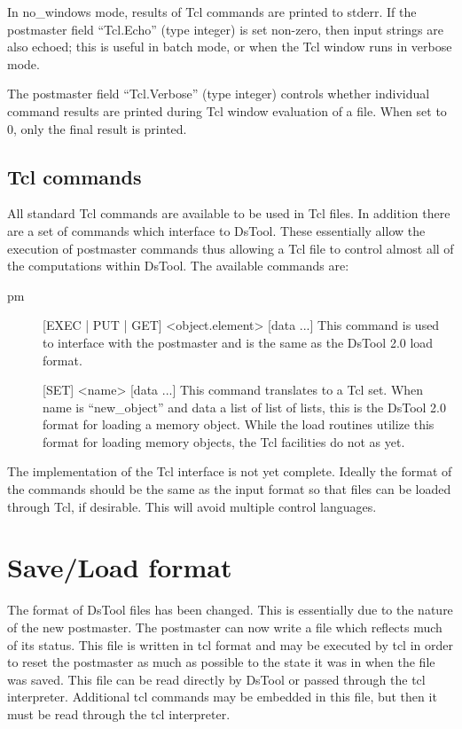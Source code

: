 In no\_windows mode, results of Tcl commands are printed to stderr. If
the postmaster field ``Tcl.Echo'' (type integer) is set non-zero, then 
input strings are also echoed; this is useful in batch mode, or when the 
Tcl window runs in verbose mode. 

The postmaster field ``Tcl.Verbose'' (type integer) controls whether 
individual command results are printed during Tcl window evaluation of
a file. When set to 0, only the final result is printed.

\subsection{Tcl commands}
All standard Tcl commands are available to be used in Tcl files.  In
addition there are a set of commands which interface to DsTool.  These
essentially allow the execution of postmaster commands thus allowing
a Tcl file to control almost all of the computations within DsTool.
The available commands are:
\begin{description}
\item[pm] [EXEC | PUT | GET] <object.element> [data ...]  This command is 
used to interface with the postmaster and is the same as the DsTool 2.0
load format.
\item[] [SET] <name> [data ...] This command translates to a Tcl set.
When name is ``new\_object'' and data a list of list of lists, this is the
DsTool 2.0 format for loading a memory object. While the load routines
utilize this format for loading memory objects, the Tcl facilities
do not as yet.
\end{description}
The implementation of the Tcl interface is not yet complete.  Ideally the
format of the commands should be the same as the input format so that files
can be loaded through Tcl, if desirable.  This will avoid multiple
control languages.


\section{Save/Load format}
The format of DsTool files has been changed.  This is essentially due
to the nature of the new postmaster.  The postmaster can now write
a file which reflects much of its status.  This file is written in
tcl format and may be executed by tcl in order to reset the postmaster
as much as possible to the state it was in when the file was saved.
This file can be read directly by DsTool or passed through the tcl interpreter.
Additional tcl commands may be embedded in this file, but then it must
be read through the tcl interpreter.

